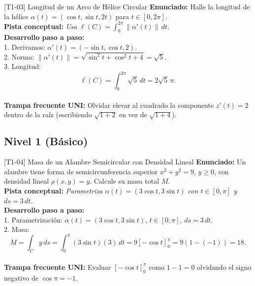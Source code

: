 \documentclass[11pt,a4paper]{article}
\begin{document}
\begin{ejerciciobox}{[T1-03] Longitud de un Arco de Hélice Circular}
\textbf{Enunciado:} Halle la longitud de la hélice $\alpha(t) = (\cos t, \sin t, 2t)$ para $t \in [0, 2\pi]$.\\[0.2cm]
\textbf{Pista conceptual:} \emph{Usa $\ell(C) = \int_0^{2\pi} \|\alpha'(t)\|\,dt$.}\\[0.2cm]
\textbf{Desarrollo paso a paso:}\\
1. Derivamos: $\alpha'(t) = (-\sin t, \cos t, 2)$.\\
2. Norma: $\|\alpha'(t)\| = \sqrt{\sin^2 t + \cos^2 t + 4} = \sqrt{5}$.\\
3. Longitud:\\
$$\ell(C) = \int_0^{2\pi} \sqrt{5}\,dt = 2\sqrt{5}\,\pi.$$\\[0.2cm]
\textbf{Trampa frecuente UNI:} Olvidar elevar al cuadrado la componente $z'(t)=2$ dentro de la raíz (escribiendo $\sqrt{1+2}$ en vez de $\sqrt{1+4}$).
\end{ejerciciobox}

\subsection{Nivel 1 (Básico)}

\begin{ejerciciobox}{[T1-04] Masa de un Alambre Semicircular con Densidad Lineal}
\textbf{Enunciado:} Un alambre tiene forma de semicircunferencia superior $x^2 + y^2 = 9$, $y \ge 0$, con densidad lineal $\rho(x,y) = y$. Calcule su masa total $M$.\\[0.2cm]
\textbf{Pista conceptual:} \emph{Parametriza $\alpha(t) = (3\cos t, 3\sin t)$ con $t \in [0, \pi]$ y $ds = 3\,dt$.}\\[0.2cm]
\textbf{Desarrollo paso a paso:}\\
1. Parametrización: $\alpha(t) = (3\cos t, 3\sin t)$, $t \in [0, \pi]$, $ds = 3\,dt$.\\
2. Masa:\\
$$M = \int_C y\,ds = \int_0^\pi (3\sin t)(3)\,dt = 9\left[-\cos t\right]_0^\pi = 9(1 - (-1)) = 18.$$\\[0.2cm]
\textbf{Trampa frecuente UNI:} Evaluar $[-\cos t]_0^\pi$ como $1 - 1 = 0$ olvidando el signo negativo de $\cos\pi = -1$.
\end{ejerciciobox}
\end{document}
